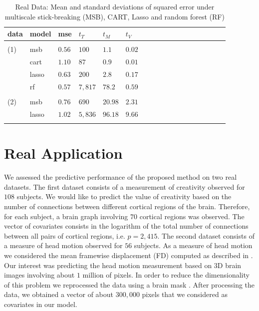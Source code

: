 \documentclass{article}
\newcommand{\francy}[1]{{\color{blue}{\it Fra says: #1}}}
\begin{document}
\begin{table}[t]
\caption{Real Data: Mean and standard deviations of squared error under multiscale stick-breaking (MSB), CART, Lasso and random forest (RF)}\label{real} \vskip 0.15in \begin{center} \begin{small} \begin{sc}
\begin{tabular}{llllllllllllllllll}
\hline
\abovespace\belowspace
data  &model&mse&$t_{T}$ & $t_{M}$ & $t_{V}$\\
\hline
\\
(1)&msb &$0.56$ & $100$ & $1.1$& $0.02$\\
 & cart & $1.10$ & $87$ & $0.9$ &$0.01$\\
& lasso & $0.63$  & $200$ & $2.8$ & $0.17$\\
& rf & $0.57$ &  $7,817$ & $78.2$ & $0.59$\\
\\
(2)&msb &$0.76$ & $690$ & $20.98$& $2.31$\\
 & lasso & $1.02$  & $5,836$ & $96.18$ & $9.66$\\
\\
\hline

\end{tabular}
\end{sc}
\end{small}
\end{center}
\vskip -0.1in
\end{table}

\section{Real Application}

We assessed the predictive performance of the proposed method on two real datasets. The first dataset consists of a measurement of creativity observed for $108$ subjects. We would like to predict the value of creativity based on the number of connections between different cortical regions of the brain. Therefore, for each subject, a brain graph involving $70$ cortical regions was observed. The vector of covariates consists in the logarithm of the total number of connections between all pairs of cortical regions, i.e. $p=2,415$. The second dataset consists of a measure of head motion observed for $56$ subjects. As a measure of head motion we considered the mean framewise displacement (FD) computed as described in \cite{Power}. Our interest was predicting the head motion measurement based on $3$D brain images involving about $1$ million of pixels.  In order to reduce the dimensionality of this problem we reprocessed the data using a brain mask \francy{say something here} . After processing the data, we obtained a vector of about $300,000$  pixels that we considered as covariates in our model.
\end{document}
